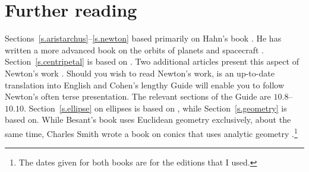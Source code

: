 
\section*{Further reading}

Sections~\ref{s.aristarchus}--\ref{s.newton} based primarily on Hahn's book \cite{hahn-cic}. He has written a more advanced book on the orbits of planets and spacecraft \cite{hahn-orbits}. Section~\ref{s.centripetal} is based on \cite{griffiths}. Two additional articles present this aspect of Newton's work \cite{hauser-lang,stein}. Should you wish to read Newton's work, \cite{newton-cohen} is an up-to-date translation into English and Cohen's lengthy Guide will enable you to follow Newton's often terse presentation. The relevant sections of the Guide are $10.8$--$10.10$. Section~\ref{s.ellipse} on ellipses is based on \cite{wiki-ellipse}, while Section~\ref{s.geometry} is based on\cite{besant}. While Besant's book uses Euclidean geometry exclusively, about the same time, Charles Smith wrote a book on conics that uses analytic geometry \cite{smith}.\footnote{The dates given for both books are for the editions that I used.}




